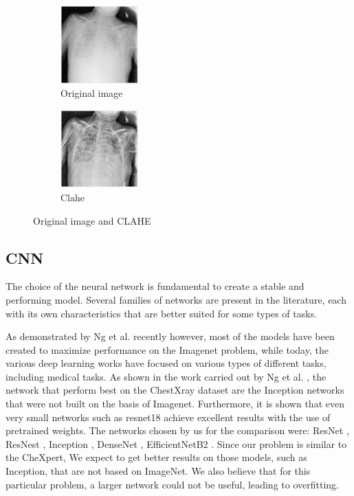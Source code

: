 \documentclass[journal, a4paper]{IEEEtran}
\begin{document}
\begin{figure}[hbtp]
	\centering
	\begin{subfigure}[c]{.4\linewidth}
		\centering
		\includegraphics[width=3cm]{images/img.png}
		\caption{Original image}
		\label{fig:Stronger CLAHE}
	\end{subfigure}\hspace{12pt}
	\begin{subfigure}[c]{.4\linewidth}
		\centering
		\includegraphics[width=3cm]{images/clahe.png}
		\caption{Clahe}
		\label{fig:tophat}
	\end{subfigure}\vspace{12pt}
	\caption{Original image and CLAHE}
	\label{fig:img}
\end{figure}

\newpage
\subsection{CNN}
The choice of the neural network is fundamental to create a stable and performing model.
Several families of networks are present in the literature, each with its own characteristics that are better suited for some types of tasks. 
    
As demonstrated by Ng et al. \cite{CHEXRAY} recently however, most of the models have been created to maximize performance on the Imagenet \cite {IMAGENET} problem, while today, the various deep learning works have focused on various types of different tasks, including medical tasks. As shown in the work carried out by Ng et al. \cite{CHEXRAY}, the network that perform best on the ChestXray dataset are the Inception networks that were not built on the basis of Imagenet. Furthermore, it is shown that even very small networks such as resnet18 achieve excellent results with the use of pretrained weights. The networks chosen by us for the comparison were: ResNet \cite{RESNET}, ResNest \cite{RESNEST}, Inception \cite{INCEPTION}, DenseNet \cite{DENSENET}, EfficientNetB2 \cite{EFFNET}.
Since our problem is similar to the CheXpert, We expect to get better results on those models, such as Inception, that are not based on ImageNet. We also believe that for this particular problem, a larger network could not be useful, leading to overfitting.
    
\end{document}
